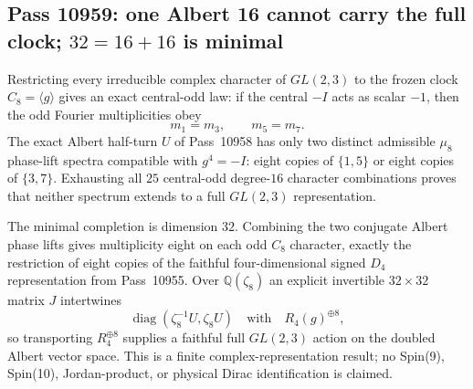 \subsection{Pass 10959: one Albert 16 cannot carry the full clock; $32=16+16$ is minimal}

Restricting every irreducible complex character of $GL(2,3)$ to the frozen
clock $C_8=\langle g\rangle$ gives an exact central-odd law:
if the central $-I$ acts as scalar $-1$, then the odd Fourier
multiplicities obey
\[
m_1=m_3,\qquad m_5=m_7.
\]
The exact Albert half-turn $U$ of Pass~10958 has only two distinct admissible
$\mu_8$ phase-lift spectra compatible with $g^4=-I$: eight copies of
$\{1,5\}$ or eight copies of $\{3,7\}$.  Exhausting all $25$
central-odd degree-$16$ character combinations proves that neither spectrum
extends to a full $GL(2,3)$ representation.

The minimal completion is dimension $32$.  Combining the two conjugate
Albert phase lifts gives multiplicity eight on each odd $C_8$ character,
exactly the restriction of eight copies of the faithful four-dimensional
signed $D_4$ representation from Pass~10955.  Over
$\mathbb Q(\zeta_8)$ an explicit invertible $32\times32$ matrix $J$
intertwines
\[
\operatorname{diag}(\zeta_8^{-1}U,\zeta_8 U)
\quad\text{with}\quad
R_4(g)^{\oplus8},
\]
so transporting $R_4^{\oplus8}$ supplies a faithful full $GL(2,3)$ action
on the doubled Albert vector space.  This is a finite complex-representation
result; no Spin(9), Spin(10), Jordan-product, or physical Dirac identification
is claimed.
